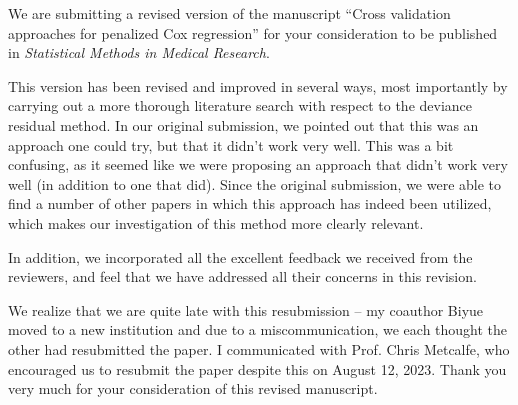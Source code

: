 \documentclass{uiletter}
\begin{document}

We are submitting a revised version of the manuscript ``Cross validation approaches for penalized Cox regression'' for your consideration to be published in \emph{Statistical Methods in Medical Research}.

This version has been revised and improved in several ways, most importantly by carrying out a more thorough literature search with respect to the deviance residual method. In our original submission, we pointed out that this was an approach one could try, but that it didn't work very well. This was a bit confusing, as it seemed like we were proposing an approach that didn't work very well (in addition to one that did). Since the original submission, we were able to find a number of other papers in which this approach has indeed been utilized, which makes our investigation of this method more clearly relevant.

In addition, we incorporated all the excellent feedback we received from the reviewers, and feel that we have addressed all their concerns in this revision. 

We realize that we are quite late with this resubmission -- my coauthor Biyue moved to a new institution and due to a miscommunication, we each thought the other had resubmitted the paper. I communicated with Prof. Chris Metcalfe, who encouraged us to resubmit the paper despite this on August 12, 2023. Thank you very much for your consideration of this revised manuscript.

\EndLetter
\end{document}
